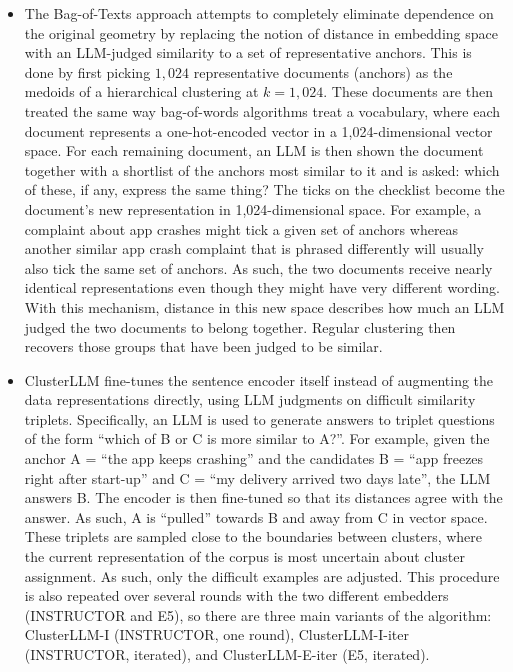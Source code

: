 \documentclass[11pt,a4paper,oneside]{report}
\begin{document}
\begin{itemize}
\item The Bag-of-Texts approach \citep{lin2025bagoftexts} attempts to completely eliminate dependence on the original geometry by replacing the notion of distance in embedding space with an LLM-judged similarity to a set of representative anchors. This is done by first picking $1{,}024$ representative documents (anchors) as the medoids of a hierarchical clustering at $k = 1{,}024$. These documents are then treated the same way bag-of-words algorithms treat a vocabulary, where each document represents a one-hot-encoded vector in a 1{,}024-dimensional vector space. For each remaining document, an LLM is then shown the document together with a shortlist of the anchors most similar to it and is asked: which of these, if any, express the same thing? The ticks on the checklist become the document's new representation in 1{,}024-dimensional space. For example, a complaint about app crashes might tick a given set of anchors whereas another similar app crash complaint that is phrased differently will usually also tick the same set of anchors. As such, the two documents receive nearly identical representations even though they might have very different wording. With this mechanism, distance in this new space describes how much an LLM judged the two documents to belong together. Regular clustering then recovers those groups that have been judged to be similar.
\item ClusterLLM \citep{zhang2023clusterllm} fine-tunes the sentence encoder itself instead of augmenting the data representations directly, using LLM judgments on difficult similarity triplets. Specifically, an LLM is used to generate answers to triplet questions of the form ``which of B or C is more similar to A?''. For example, given the anchor A = ``the app keeps crashing'' and the candidates B = ``app freezes right after start-up'' and C = ``my delivery arrived two days late'', the LLM answers B. The encoder is then fine-tuned so that its distances agree with the answer. As such, A is ``pulled'' towards B and away from C in vector space. These triplets are sampled close to the boundaries between clusters, where the current representation of the corpus is most uncertain about cluster assignment. As such, only the difficult examples are adjusted. This procedure is also repeated over several rounds with the two different embedders (INSTRUCTOR and E5), so there are three main variants of the algorithm: ClusterLLM-I (INSTRUCTOR, one round), ClusterLLM-I-iter (INSTRUCTOR, iterated), and ClusterLLM-E-iter (E5, iterated).
\end{itemize}
\end{document}
